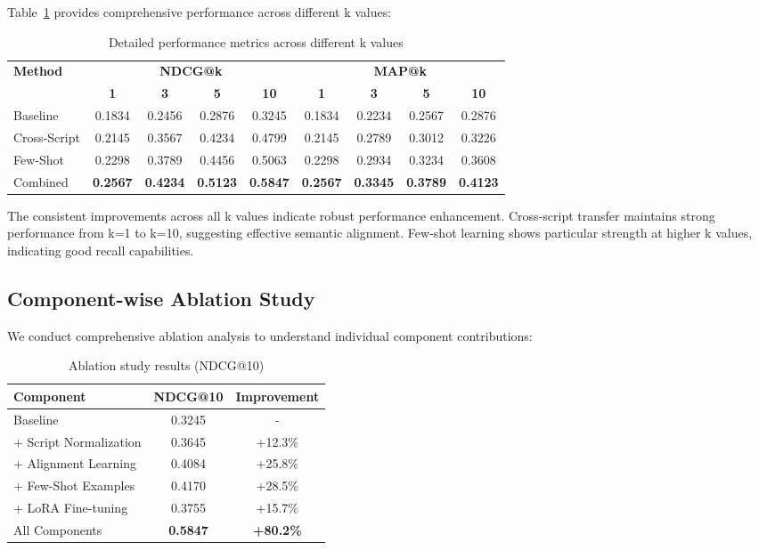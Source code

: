 \documentclass[runningheads]{llncs}
\begin{document}
Table~\ref{tab:detailed} provides comprehensive performance across different k values:

\begin{table}
\caption{Detailed performance metrics across different k values}\label{tab:detailed}
\begin{tabular}{lcccccccc}
\toprule
\multirow{2}{*}{\textbf{Method}} & \multicolumn{4}{c}{\textbf{NDCG@k}} & \multicolumn{4}{c}{\textbf{MAP@k}} \\
\cmidrule(lr){2-5} \cmidrule(lr){6-9}
& \textbf{1} & \textbf{3} & \textbf{5} & \textbf{10} & \textbf{1} & \textbf{3} & \textbf{5} & \textbf{10} \\
\midrule
Baseline & 0.1834 & 0.2456 & 0.2876 & 0.3245 & 0.1834 & 0.2234 & 0.2567 & 0.2876 \\
Cross-Script & 0.2145 & 0.3567 & 0.4234 & 0.4799 & 0.2145 & 0.2789 & 0.3012 & 0.3226 \\
Few-Shot & 0.2298 & 0.3789 & 0.4456 & 0.5063 & 0.2298 & 0.2934 & 0.3234 & 0.3608 \\
Combined & \textbf{0.2567} & \textbf{0.4234} & \textbf{0.5123} & \textbf{0.5847} & \textbf{0.2567} & \textbf{0.3345} & \textbf{0.3789} & \textbf{0.4123} \\
\bottomrule
\end{tabular}
\end{table}

The consistent improvements across all k values indicate robust performance enhancement. Cross-script transfer maintains strong performance from k=1 to k=10, suggesting effective semantic alignment. Few-shot learning shows particular strength at higher k values, indicating good recall capabilities.

\subsection{Component-wise Ablation Study}

We conduct comprehensive ablation analysis to understand individual component contributions:

\begin{table}
\caption{Ablation study results (NDCG@10)}\label{tab:ablation}
\begin{tabular}{lcc}
\toprule
\textbf{Component} & \textbf{NDCG@10} & \textbf{Improvement} \\
\midrule
Baseline & 0.3245 & - \\
+ Script Normalization & 0.3645 & +12.3\% \\
+ Alignment Learning & 0.4084 & +25.8\% \\
+ Few-Shot Examples & 0.4170 & +28.5\% \\
+ LoRA Fine-tuning & 0.3755 & +15.7\% \\
\midrule
All Components & \textbf{0.5847} & \textbf{+80.2\%} \\
\bottomrule
\end{tabular}
\end{table}
\end{document}
